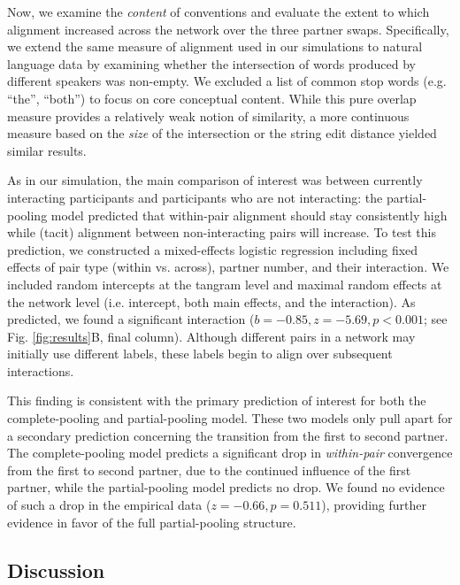 Now, we examine the \emph{content} of conventions and evaluate the extent to which alignment increased across the network over the three partner swaps. 
Specifically, we extend the same measure of alignment used in our simulations to natural language data by examining whether the intersection of words produced by different speakers was non-empty.
We excluded a list of common stop words (e.g. ``the'', ``both'') to focus on core conceptual content.
While this pure overlap measure provides a relatively weak notion of similarity, a more continuous measure based on the \emph{size} of the intersection or the string edit distance yielded similar results.

As in our simulation, the main comparison of interest was between currently interacting participants and participants who are not interacting: the partial-pooling model predicted that within-pair alignment should stay consistently high while (tacit) alignment between non-interacting pairs will increase. 
To test this prediction, we constructed a mixed-effects logistic regression including fixed effects of pair type (within vs. across), partner number, and their interaction.
We included random intercepts at the tangram level and maximal random effects at the network level (i.e. intercept, both main effects, and the interaction).
As predicted, we found a significant interaction ($b = -0.85, z = -5.69, p < 0.001$; see Fig. \ref{fig:results}B, final column).
Although different pairs in a network may initially use different labels, these labels begin to align over subsequent interactions. 

This finding is consistent with the primary prediction of interest for both the complete-pooling and partial-pooling model. %
These two models only pull apart for a secondary prediction concerning the transition from the first to second partner.
The complete-pooling model predicts a significant drop in \emph{within-pair} convergence from the first to second partner, due to the continued influence of the first partner, while the partial-pooling model predicts no drop. 
We found no evidence of such a drop in the empirical data ($z=-0.66, p = 0.511$), providing further evidence in favor of the full partial-pooling structure.

\subsection{Discussion}

